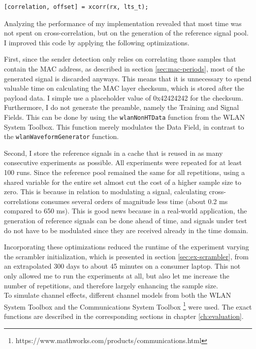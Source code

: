 \begin{lstlisting}[captionpos=b,caption={Cross-Correlation of an LTF Symbol},label=lst:xcorr]
[correlation, offset] = xcorr(rx, lts_t);
\end{lstlisting}

Analyzing the performance of my implementation revealed that most time was not spent on cross-correlation, but on the generation of the reference signal pool. I improved this code by applying the following optimizations.

First, since the sender detection only relies on correlating those samples that contain the \gls{MAC} address, as described in section \ref{sec:mac-periods}, most of the generated signal is discarded anyways. This means that it is unnecessary to spend valuable time on calculating the \gls{MAC} layer checksum, which is stored after the payload data. I simple use a placeholder value of 0x42424242 for the checksum. Furthermore, I do not generate the preamble, namely the Training and Signal Fields. This can be done by using the \texttt{wlanNonHTData} function from the WLAN System Toolbox. This function merely modulates the Data Field, in contrast to the \texttt{wlanWaveformGenerator} function.

Second, I store the reference signals in a cache that is reused in as many consecutive experiments as possible. All experiments were repeated for at least 100 runs. Since the reference pool remained the same for all repetitions, using a shared variable for the entire set almost cut the cost of a higher sample size to zero. This is because in relation to modulating a signal, calculating cross-correlations consumes several orders of magnitude less time (about 0.2 ms compared to 650 ms). This is good news because in a real-world application, the generation of reference signals can be done ahead of time, and signals under test do not have to be modulated since they are received already in the time domain.

Incorporating these optimizations reduced the runtime of the experiment varying the scrambler initialization, which is presented in section \ref{sec:ex-scrambler}, from an extrapolated 300 days to about 45 minutes on a consumer laptop. This not only allowed me to run the experiments at all, but also let me increase the number of repetitions, and therefore largely enhancing the sample size.\\

To simulate channel effects, different channel models from both the WLAN System Toolbox and the Communications System Toolbox \footnote{https://www.mathworks.com/products/communications.html} were used. The exact functions are described in the corresponding sections in chapter \ref{ch:evaluation}.\\

